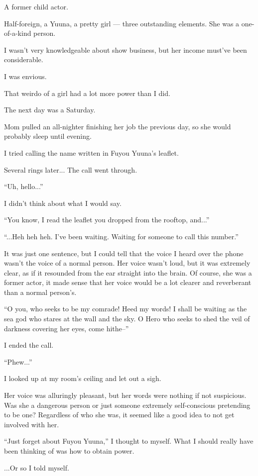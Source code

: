 A former child actor.

Half-foreign, a Yuuna, a pretty girl --- three outstanding elements. She was a one-of-a-kind person.

I wasn't very knowledgeable about show business, but her income must've been considerable.

I was envious.

That weirdo of a girl had a lot more power than I did.

The next day was a Saturday.

Mom pulled an all-nighter finishing her job the previous day, so she would probably sleep until evening.

I tried calling the name written in Fuyou Yuuna's leaflet.

Several rings later... The call went through.

``Uh, hello...''

I didn't think about what I would say.

``You know, I read the leaflet you dropped from the rooftop, and...''

``...Heh heh heh. I've been waiting. Waiting for someone to call this number.''

It was just one sentence, but I could tell that the voice I heard over the phone wasn't the voice of a normal person. Her voice wasn't loud, but it was extremely clear, as if it resounded from the ear straight into the brain. Of course, she was a former actor, it made sense that her voice would be a lot clearer and reverberant than a normal person's.

``O you, who seeks to be my comrade! Heed my words! I shall be waiting as the sea god who stares at the wall and the sky. O Hero who seeks to shed the veil of darkness covering her eyes, come hithe--''

I ended the call.

``Phew...''

I looked up at my room's ceiling and let out a sigh.

Her voice was alluringly pleasant, but her words were nothing if not suspicious. Was she a dangerous person or just someone extremely self-conscious pretending to be one? Regardless of who she was, it seemed like a good idea to not get involved with her.

``Just forget about Fuyou Yuuna,'' I thought to myself. What I should really have been thinking of was how to obtain power.

...Or so I told myself.

